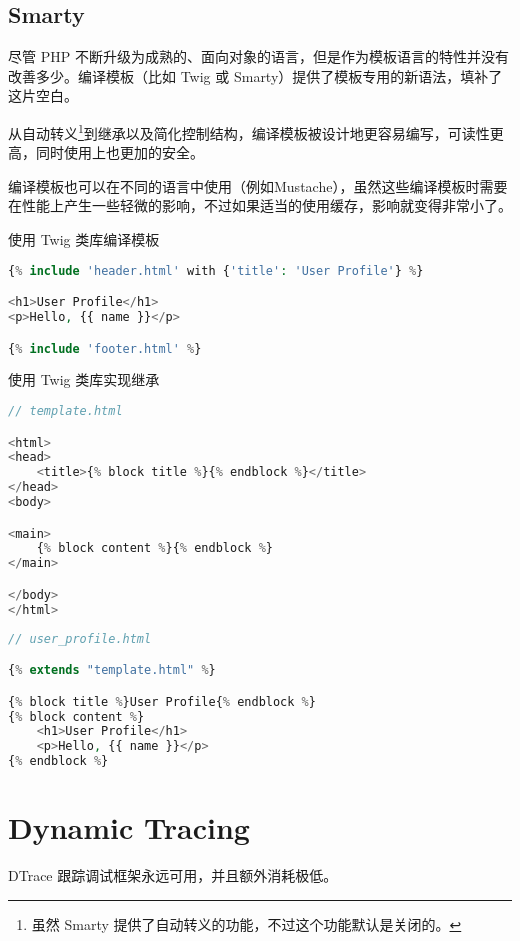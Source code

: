 \subsection{Smarty}


尽管 PHP 不断升级为成熟的、面向对象的语言，但是作为模板语言的特性并没有改善多少。编译模板（比如 Twig 或 Smarty）提供了模板专用的新语法，填补了这片空白。

从自动转义\footnote{虽然 Smarty 提供了自动转义的功能，不过这个功能默认是关闭的。}到继承以及简化控制结构，编译模板被设计地更容易编写，可读性更高，同时使用上也更加的安全。

编译模板也可以在不同的语言中使用（例如Mustache），虽然这些编译模板时需要在性能上产生一些轻微的影响，不过如果适当的使用缓存，影响就变得非常小了。

\begin{example}
使用 Twig 类库编译模板
\begin{lstlisting}[language=PHP]
{% include 'header.html' with {'title': 'User Profile'} %}

<h1>User Profile</h1>
<p>Hello, {{ name }}</p>

{% include 'footer.html' %}
\end{lstlisting}
\end{example}

\begin{example}
使用 Twig 类库实现继承
\begin{lstlisting}[language=PHP]
// template.html

<html>
<head>
    <title>{% block title %}{% endblock %}</title>
</head>
<body>

<main>
    {% block content %}{% endblock %}
</main>

</body>
</html>
\end{lstlisting}
\end{example}

\begin{lstlisting}[language=PHP]
// user_profile.html

{% extends "template.html" %}

{% block title %}User Profile{% endblock %}
{% block content %}
    <h1>User Profile</h1>
    <p>Hello, {{ name }}</p>
{% endblock %}
\end{lstlisting}


\section{Dynamic Tracing}

DTrace 跟踪调试框架永远可用，并且额外消耗极低。

